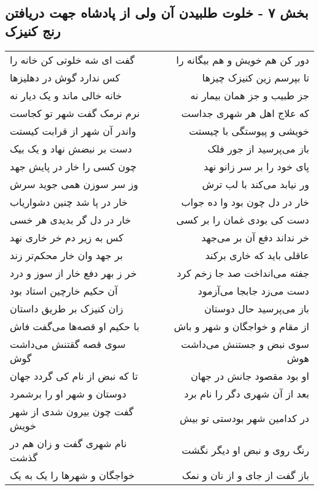 \begin{center}
\section*{بخش ۷ - خلوت طلبیدن آن ولی از پادشاه جهت دریافتن رنج کنیزک}
\label{sec:sh007}
\begin{longtable}{l p{0.5cm} r}
گفت ای شه خلوتی کن خانه را
&&
دور کن هم خویش و هم بیگانه را
\\
کس ندارد گوش در دهلیزها
&&
تا بپرسم زین کنیزک چیزها
\\
خانه خالی ماند و یک دیار نه
&&
جز طبیب و جز همان بیمار نه
\\
نرم نرمک گفت شهر تو کجاست
&&
که علاج اهل هر شهری جداست
\\
واندر آن شهر از قرابت کیستت
&&
خویشی و پیوستگی با چیستت
\\
دست بر نبضش نهاد و یک بیک
&&
باز می‌پرسید از جور فلک
\\
چون کسی را خار در پایش جهد
&&
پای خود را بر سر زانو نهد
\\
وز سر سوزن همی جوید سرش
&&
ور نیابد می‌کند با لب ترش
\\
خار در پا شد چنین دشواریاب
&&
خار در دل چون بود وا ده جواب
\\
خار در دل گر بدیدی هر خسی
&&
دست کی بودی غمان را بر کسی
\\
کس به زیر دم خر خاری نهد
&&
خر نداند دفع آن بر می‌جهد
\\
بر جهد وان خار محکم‌تر زند
&&
عاقلی باید که خاری برکند
\\
خر ز بهر دفع خار از سوز و درد
&&
جفته می‌انداخت صد جا زخم کرد
\\
آن حکیم خارچین استاد بود
&&
دست می‌زد جابجا می‌آزمود
\\
زان کنیزک بر طریق داستان
&&
باز می‌پرسید حال دوستان
\\
با حکیم او قصه‌ها می‌گفت فاش
&&
از مقام و خواجگان و شهر و باش
\\
سوی قصه گقتنش می‌داشت گوش
&&
سوی نبض و جستنش می‌داشت هوش
\\
تا که نبض از نام کی گردد جهان
&&
او بود مقصود جانش در جهان
\\
دوستان و شهر او را برشمرد
&&
بعد از آن شهری دگر را نام برد
\\
گفت چون بیرون شدی از شهر خویش
&&
در کدامین شهر بودستی تو بیش
\\
نام شهری گفت و زان هم در گذشت
&&
رنگ روی و نبض او دیگر نگشت
\\
خواجگان و شهرها را یک به یک
&&
باز گفت از جای و از نان و نمک
\\

\end{longtable}
\end{center}
